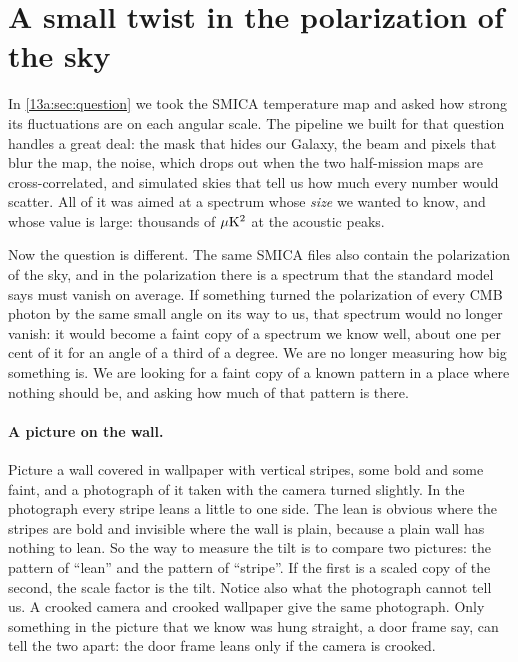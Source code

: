 \section{A small twist in the polarization of the sky}
\label{13e:sec:question}

In \cref{13a:sec:question} we took the SMICA temperature map and asked how strong its fluctuations are on
each angular scale. The pipeline we built for that question handles a great deal: the mask that hides our
Galaxy, the beam and pixels that blur the map, the noise, which drops out when the two half-mission maps
are cross-correlated, and simulated skies that tell us how much every number would scatter. All of it
was aimed at a spectrum whose \emph{size} we wanted to know, and whose value is large: thousands of
$\mu{\rm K}^2$ at the acoustic peaks.

Now the question is different. The same SMICA files also contain the polarization of the sky, and in
the polarization there is a spectrum that the standard model says must vanish on average. If something
turned the polarization of every CMB photon by the same small angle on its way to us, that spectrum
would no longer vanish: it would become a faint copy of a spectrum we know well, about one per cent of
it for an angle of a third of a degree. We are no longer measuring how big something is. We are looking
for a faint copy of a known pattern in a place where nothing should be, and asking how much of that
pattern is there.

\paragraph{A picture on the wall.} Picture a wall covered in wallpaper with vertical stripes, some
bold and some faint, and a photograph of it taken with the camera turned slightly. In the photograph every
stripe leans a little to one side. The lean is obvious where the stripes are bold and invisible where
the wall is plain, because a plain wall has nothing to lean. So the way to measure the tilt is to compare
two pictures: the pattern of ``lean'' and the pattern of ``stripe''. If the first is a scaled copy of the
second, the scale factor is the tilt. Notice also what the photograph cannot tell us. A crooked camera and
crooked wallpaper give the same photograph. Only something in the picture that we know was hung straight,
a door frame say, can tell the two apart: the door frame leans only if the camera is crooked.

